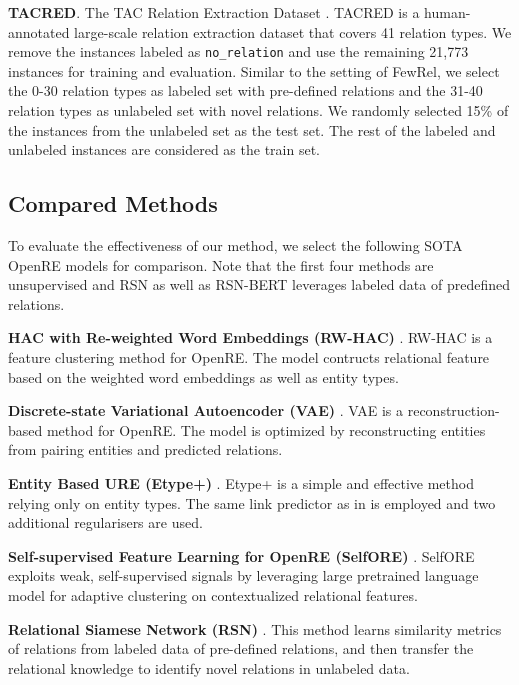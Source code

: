\documentclass[11pt]{article}
\begin{document}
        \noindent\textbf{TACRED}. The TAC Relation Extraction Dataset \citep{zhang-etal-2017-position}. TACRED is a human-annotated large-scale relation extraction dataset that covers 41 relation types. We remove the instances labeled as \texttt{no\_relation} and use the remaining 21,773 instances for training and evaluation. Similar to the setting of FewRel, we select the 0-30 relation types as labeled set with pre-defined relations and the 31-40 relation types as unlabeled set with novel relations. We randomly selected 15\% of the instances from the unlabeled set as the test set. The rest of the labeled and unlabeled instances are considered as the train set.
        
    \subsection{Compared Methods}To evaluate the effectiveness of our method, we select the following SOTA OpenRE models for comparison. Note that the first four methods are unsupervised and RSN as well as RSN-BERT leverages labeled data of predefined relations.
        
        \noindent\textbf{HAC with Re-weighted Word Embeddings (RW-HAC)} \citep{10.1007/978-3-319-70407-4_3}. RW-HAC is a feature clustering method for OpenRE. The model contructs relational feature based on the weighted word embeddings as well as entity types.


        \noindent\textbf{Discrete-state Variational Autoencoder (VAE)} \citep{marcheggiani-titov-2016-discrete}. VAE is a reconstruction-based method for OpenRE. The model is optimized by reconstructing entities from pairing entities and predicted relations. 

        \noindent\textbf{Entity Based URE (Etype+)} \citep{tran-etal-2020-revisiting}. Etype+ is a simple and effective method relying only on entity types. The same link predictor as in \citep{marcheggiani-titov-2016-discrete} is employed and two additional regularisers are used.
        
        \noindent\textbf{Self-supervised Feature Learning for OpenRE (SelfORE)} \citep{hu2020selfore}. SelfORE exploits weak, self-supervised signals by leveraging large pretrained language model for adaptive clustering on contextualized relational features.
        
        \noindent\textbf{Relational Siamese Network (RSN)} \citep{wu-etal-2019-open}. This method learns similarity metrics of relations from labeled data of pre-defined relations, and then transfer the relational knowledge to identify novel relations in unlabeled data. 
        
\end{document}

